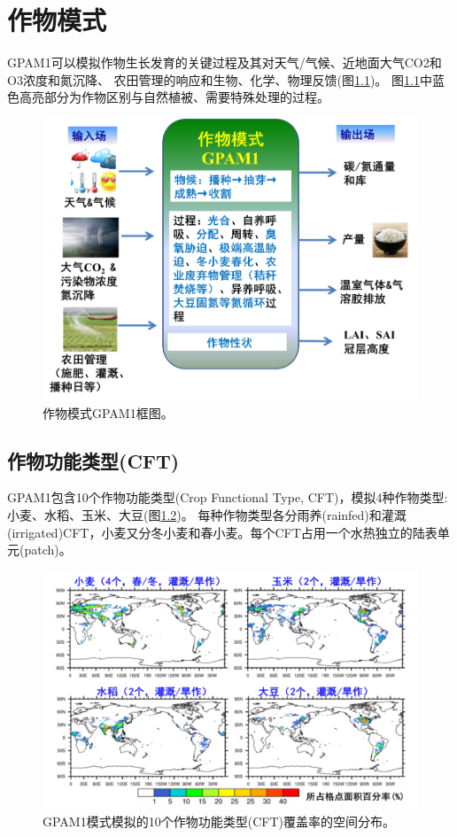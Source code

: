\chapter{作物模式}

GPAM1可以模拟作物生长发育的关键过程及其对天气/气候、近地面大气CO2和O3浓度和氮沉降、
农田管理的响应和生物、化学、物理反馈(图\ref{fig:作物模式GPAM1框图})。
图\ref{fig:作物模式GPAM1框图}中蓝色高亮部分为作物区别与自然植被、需要特殊处理的过程。
{
\begin{figure}[]
\centering
\includegraphics{Figures/作物模式/作物模式GPAM1框图.png}
\caption{作物模式GPAM1框图。  }
\label{fig:作物模式GPAM1框图}
\end{figure}
}
\section{作物功能类型(CFT)}
GPAM1包含10个作物功能类型(Crop Functional Type, CFT)，模拟4种作物类型: 小麦、水稻、玉米、大豆(图\ref{fig:作物功能类型覆盖率的空间分布})。
每种作物类型各分雨养(rainfed)和灌溉(irrigated)CFT，小麦又分冬小麦和春小麦。每个CFT占用一个水热独立的陆表单元(patch)。
{
\begin{figure}[]
\centering
\includegraphics{Figures/作物模式/作物功能类型覆盖率的空间分布.png}
\caption{GPAM1模式模拟的10个作物功能类型(CFT)覆盖率的空间分布。}
\label{fig:作物功能类型覆盖率的空间分布}
\end{figure}
}
